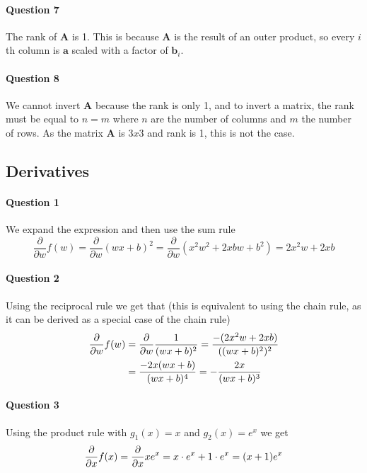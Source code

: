 \documentclass[a4paper, 11pt]{article}
\newcommand{\vect}[1]{\textbf{#1}}
\newcommand{\mat}[1]{\textbf{#1}}
\begin{document}
\paragraph{Question 7}
The rank of $\mat A$ is 1. This is because $\mat A$ is the result of an outer product, so every $i$th column is $\vect a$ scaled with a factor of $\vect b_i$.

\paragraph{Question 8}
We cannot invert $\mat A$ because the rank is only 1, and to invert a matrix, the rank must be equal to $n=m$ where $n$ are the number of columns and $m$ the number of rows. As the matrix $\mat A$ is $3x3$ and rank is 1, this is not the case.

\subsection{Derivatives}
\label{sub:derivatives}

\paragraph{Question 1}
We expand the expression and then use the sum rule
\[
    \frac{\partial}{\partial w}f(w) = \frac{\partial}{\partial w} (wx+b)^2 = \frac{\partial}{\partial w} \left(x^2w^2+2xbw+b^2 \right) = 2x^2w+2xb
\]

\paragraph{Question 2}
Using the reciprocal rule we get that (this is equivalent to using the chain rule, as it can be derived as a special case of the chain rule)
\begin{align*}
    {\partial \over \partial w} f(w)
    &= {\partial \over \partial w} {1 \over (wx+b)^2}
    = {-(2x^2 w + 2xb) \over ((wx+b)^2)^2} \\
    &= {-2x (wx + b) \over (wx+b)^4}
    = - {2x \over (wx + b)^3}
\end{align*}

\paragraph{Question 3}
Using the product rule with $g_1(x) = x$ and $g_2(x) = e^x$ we get
\[
    {\partial \over \partial x} f(x)
    = {\partial \over \partial x} x e^x
    = x \cdot e^x + 1 \cdot e^x
    = (x + 1) e^x
\]
\end{document}
